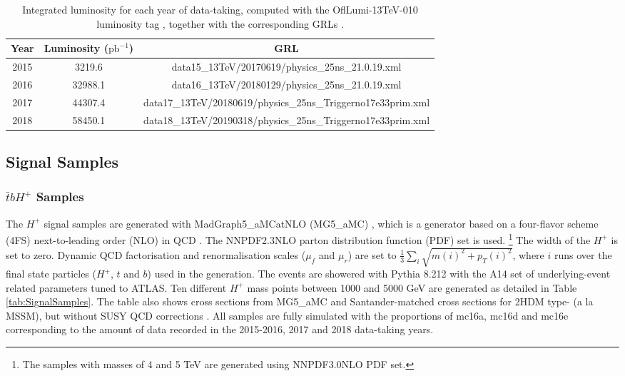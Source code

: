 \begin{table}[H]
  \centering
  \begin{tabular*}{150mm}{@{\extracolsep{\fill}}ccc}
    \hline\hline
    Year & Luminosity ($\text{pb}^{-1}$) & GRL\\
    \hline
    2015 & 3219.6  & data15\_13TeV/20170619/physics\_25ns\_21.0.19.xml\\
    2016 & 32988.1 & data16\_13TeV/20180129/physics\_25ns\_21.0.19.xml\\
    2017 & 44307.4 & data17\_13TeV/20180619/physics\_25ns\_Triggerno17e33prim.xml\\
    2018 & 58450.1 & data18\_13TeV/20190318/physics\_25ns\_Triggerno17e33prim.xml\\
    \hline\hline
  \end{tabular*}
  \caption{Integrated luminosity for each year of data-taking, computed with the OflLumi-13TeV-010 luminosity
  tag \cite{LuminosityForPhysis}, together with the corresponding GRLs \cite{GoodRunListRun2}.}
  \label{tab:GRLForData}
\end{table}

\subsection{Signal Samples}
\label{subsec:SignalSample}

\subsubsection{$\bar{t}bH^{+}$ Samples}
\label{subsec:HpSample}

\setcounter{Num}{2}

The $H^{+}$ signal samples are generated with MadGraph5\_aMCatNLO (MG5\_aMC) \cite{C.Degrande-2015}, which is a generator based on a four-flavor scheme (4FS) next-to-leading order (NLO) in QCD \cite{Alwall:2014hca}. The NNPDF2.3NLO \cite{Ball:2012cx} parton distribution function (PDF) set is used. \footnote{The samples with masses of 4 and 5 TeV are generated using NNPDF3.0NLO \cite{Ball:2014uwa} PDF set.} The width of the $H^{+}$ is set to zero. Dynamic QCD factorisation and renormalisation scales ($\mu_{f}$ and $\mu_{r}$) are set to $\frac{1}{3}\sum_{i}\sqrt{m(i)^{2}+p_{T}(i)^{2}}$, where $i$ runs over the final state particles ($H^{+}$, $t$ and $b$) used in the generation. The events are showered with Pythia 8.212 \cite{Sjostrand:2007gs} with the A14 \cite{ATL-PHYS-PUB-2014-021} set of underlying-event related parameters tuned to ATLAS. Ten different $H^{+}$ mass points between 1000 and 5000 GeV are generated as detailed in Table \ref{tab:SignalSamples}. The table also shows cross sections from MG5\_aMC and Santander-matched cross sections for 2HDM type- (a la MSSM), but without SUSY QCD corrections \cite{C.Degrande-2015, M.Flechl-2015, S.Dittmaier-2011, E.L.Berger-2005}. All samples are fully simulated with the proportions of mc16a, mc16d and mc16e corresponding to the amount of data recorded in the 2015-2016, 2017 and 2018 data-taking years.

